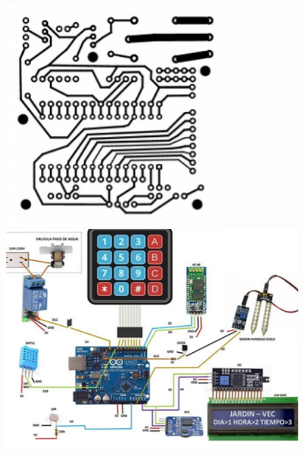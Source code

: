 \documentclass[a4paper,11pt,titlepage]{article}
\begin{document}
\begin{titlepage}
  \includegraphics[height=10cm]{imag.png} \\
  
  \includegraphics[height=10cm]{teclado.png} \\
                                                                                                                                                                                                                                                                                                                                                                                                        
   
\end{titlepage}
\end{document}

